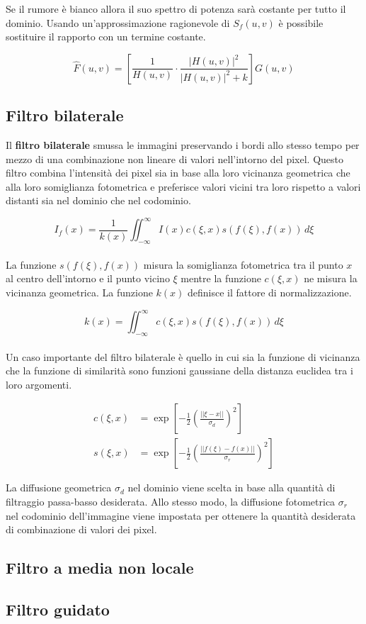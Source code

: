 \documentclass[../main.tex]{subfiles}
\begin{document}
Se il rumore è bianco allora il suo spettro di potenza sarà costante per tutto il dominio. Usando un'approssimazione ragionevole di $S_f(u,v)$ è possibile sostituire il rapporto con un termine costante.

\begin{equation}
	\hat{F}(u,v)= \left[\frac{1}{H(u,v)} \cdot \frac{\left|H(u,v)\right|^2}{\left|H(u,v)\right|^2+k}\right] G(u,v)
\end{equation}

\subsection{Filtro bilaterale}

Il \textbf{filtro bilaterale} smussa le immagini preservando i bordi allo stesso tempo per mezzo di una combinazione non lineare di valori nell'intorno del pixel. Questo filtro combina l'intensità dei pixel sia in base alla loro vicinanza geometrica che alla loro somiglianza fotometrica e preferisce valori vicini tra loro rispetto a valori distanti sia nel dominio che nel codominio.\cite{tomasi_1998}

\begin{equation}
	I_f(x) = \frac{1}{k(x)}\iint_{-\infty}^{\infty}I(x)c(\xi,x)s(f(\xi),f(x))\,d\xi
\end{equation}
\\[-10pt]
La funzione $s(f(\xi),f(x))$ misura la somiglianza fotometrica tra il punto $x$ al centro dell'intorno e il punto vicino $\xi$ mentre la funzione $c(\xi,x)$ ne misura la vicinanza geometrica. La funzione $k(x)$ definisce il fattore di normalizzazione.

\begin{equation}
	k(x) = \iint_{-\infty}^{\infty}c(\xi,x)s(f(\xi),f(x))\,d\xi
\end{equation}
\\[-10pt]
Un caso importante del filtro bilaterale è quello in cui sia la funzione di vicinanza che la funzione di similarità sono funzioni gaussiane della distanza euclidea tra i loro argomenti.

\begin{align}
	c(\xi,x) &= \exp\left[-\frac{1}{2}\left(\frac{||\xi-x||}{\sigma_d}\right)^2\right]\\
	s(\xi,x) &= \exp\left[-\frac{1}{2}\left(\frac{||f(\xi)-f(x)||}{\sigma_r}\right)^2\right]
\end{align}

La diffusione geometrica $\sigma_d$ nel dominio viene scelta in base alla quantità di filtraggio passa-basso desiderata. Allo stesso modo, la diffusione fotometrica $\sigma_r$ nel codominio dell'immagine viene impostata per ottenere la quantità desiderata di combinazione di valori dei pixel.

\subsection{Filtro a media non locale}

\subsection{Filtro guidato}
\end{document}
